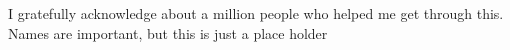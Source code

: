 %
%
%
%
%
I gratefully acknowledge about a million people who helped me get through this. Names are important, but this is just a place holder